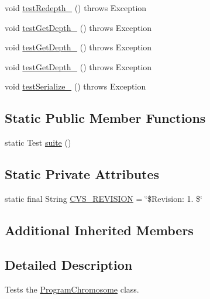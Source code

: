 \begin{DoxyCompactItemize}
\item 
void \hyperlink{classorg_1_1jgap_1_1gp_1_1impl_1_1_program_chromosome_test_aee3a44c14c3255817c12543cb57e371c}{test\-Redepth\-\_} ()  throws Exception 
\item 
void \hyperlink{classorg_1_1jgap_1_1gp_1_1impl_1_1_program_chromosome_test_adc02be903e14f24c5975bffc0639b54a}{test\-Get\-Depth\-\_} ()  throws Exception 
\item 
void \hyperlink{classorg_1_1jgap_1_1gp_1_1impl_1_1_program_chromosome_test_a7cc9e683d19afd68a4b0ee4c30e86201}{test\-Get\-Depth\-\_} ()  throws Exception 
\item 
void \hyperlink{classorg_1_1jgap_1_1gp_1_1impl_1_1_program_chromosome_test_a94c3273da4c15a90e4b99d615fdb0b03}{test\-Get\-Depth\-\_} ()  throws Exception 
\item 
void \hyperlink{classorg_1_1jgap_1_1gp_1_1impl_1_1_program_chromosome_test_a34683eacb0305ff93bd4e742ad50e50f}{test\-Serialize\-\_} ()  throws Exception 
\end{DoxyCompactItemize}
\subsection*{Static Public Member Functions}
\begin{DoxyCompactItemize}
\item 
static Test \hyperlink{classorg_1_1jgap_1_1gp_1_1impl_1_1_program_chromosome_test_a7b03e9f827d4c3ab4b0fbf72358e7b05}{suite} ()
\end{DoxyCompactItemize}
\subsection*{Static Private Attributes}
\begin{DoxyCompactItemize}
\item 
static final String \hyperlink{classorg_1_1jgap_1_1gp_1_1impl_1_1_program_chromosome_test_a4c081eb4f908153b972f1bb6ec31327b}{C\-V\-S\-\_\-\-R\-E\-V\-I\-S\-I\-O\-N} = \char`\"{}\$Revision\-: 1. \$\char`\"{}
\end{DoxyCompactItemize}
\subsection*{Additional Inherited Members}


\subsection{Detailed Description}
Tests the \hyperlink{classorg_1_1jgap_1_1gp_1_1impl_1_1_program_chromosome}{Program\-Chromosome} class.

